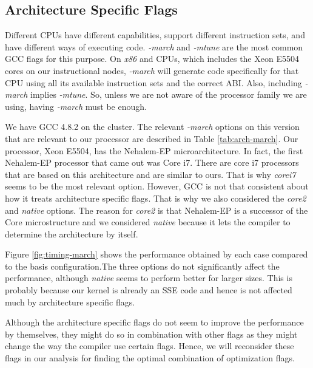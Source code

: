 \documentclass{article}
\begin{document}
\subsection{Architecture Specific Flags}

Different CPUs have different capabilities, support different instruction sets, and have different ways of executing code. \textit{-march} and \textit{-mtune} are the most common GCC flags for this purpose. On \textit{x86} and  CPUs, which includes the Xeon E5504 cores on our instructional nodes, \textit{-march} will generate code specifically for that CPU using all its available instruction sets and the correct ABI. Also, including \textit{-march} implies \textit{-mtune}. So, unless we are not aware of the processor family we are using, having \textit{-march} must be enough. 

We have GCC 4.8.2 on the cluster. The relevant \textit{-march} options on this version that are relevant to our processor are described in Table \ref{tab:arch-march}. Our processor, Xeon E5504, has the Nehalem-EP microarchitecture.  In fact, the first Nehalem-EP processor that came out was Core i7. There are core i7 processors that are based on this architecture and are similar to ours. That is why \textit{corei7} seems to be the most relevant option. However, GCC is not that consistent about how it treats architecture specific flags. That is why we also considered the \textit{core2} and \textit{native} options. The reason for \textit{core2} is that Nehalem-EP is a successor of the Core microstructure and we considered \textit{native} because it lets the compiler to determine the architecture by itself. 

Figure \ref{fig:timing-march} shows the performance obtained by each case compared to the basis configuration.The three options do not significantly affect the performance, although \textit{native} seems to perform better for larger sizes. This is probably because our kernel is already an SSE code and hence is not affected much by architecture specific flags. 

Although the architecture specific flags do not seem to improve the performance by themselves, they might do so in combination with other flags as they might change the way the compiler use certain flags. Hence, we will reconsider these flags in our analysis for finding the optimal combination of optimization flags.
\end{document}
